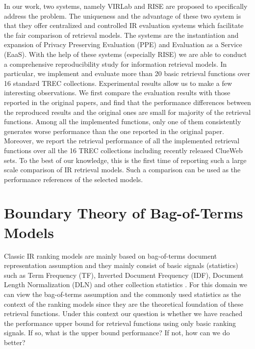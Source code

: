 In our work, two systems, namely VIRLab \cite{Fang:2014:VWV:2600428.2611178} 
and RISE \cite{Yang:2016:RSI:2970398.2970415} are proposed to specifically 
address the problem. The uniqueness and the advantage of these two system is 
that they offer centralized and controlled IR evaluation systems which 
facilitate the fair comparison of retrieval models. The systems are the 
instantiation and expansion of Privacy Preserving Evaluation (PPE)\cite{Fang:2014:VWV:2600428.2611178} 
and Evaluation as a Service (EaaS)\cite{rao:ecir:2015}. 
With the help of these systems (especially RISE) we are able to conduct a 
comprehensive reproducibility study for information retrieval models. 
In particular, we implement and evaluate more than 20 basic retrieval 
functions over 16 standard TREC collections. Experimental results allow us to 
make a few interesting observations. We first compare the evaluation results 
with those reported in the original papers, and find that the performance 
differences between the reproduced results and the original ones are small 
for majority of the retrieval functions. Among all the implemented functions, 
only one of them consistently generates worse performance than the one 
reported in the original paper. Moreover, we report the retrieval 
performance of all the implemented retrieval functions over all the 16 
TREC collections including recently released ClueWeb sets. 
To the best of our knowledge, this is the first time of reporting such a 
large scale comparison of IR retrieval models. Such a comparison can be used 
as the performance references of the selected models.


\section{Boundary Theory of Bag-of-Terms Models}
Classic IR ranking models \cite{Robertson96okapiat3,Singhal:1996:PDL:243199.243206,Zhai:2004:SSM:984321.984322,Amati:2002:PMI:582415.582416,Fang:2005:EAA:1076034.1076116,Lv:2011:LTF:2063576.2063584,He:2005:SDP:1076034.1076114} 
are mainly based on bag-of-terms document representation assumption and 
they mainly consist of basic signals (statistics) such as Term Frequency (TF), 
Inverted Document Frequency (IDF), Document Length Normalization (DLN) 
and other collection statistics \cite{Fang:2004:FSI:1008992.1009004}. 
For this domain we can view the bag-of-terms assumption and the 
commonly used statistics as the context of the ranking models since they 
are the theoretical foundation of these retrieval functions. 
Under this context our question is whether we have reached the performance 
upper bound for retrieval functions using only basic ranking signals. 
If so, what is the upper bound performance? If not, how can we do better? 

